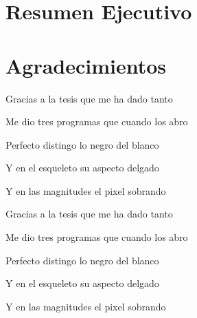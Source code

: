 \begin{preface}
\section{Resumen Ejecutivo}


\section{Agradecimientos}

\noindent Gracias a la tesis que me ha dado tanto

\noindent Me dio tres programas que cuando los abro

\noindent Perfecto distingo lo negro del blanco

\noindent Y en el esqueleto su aspecto delgado

\noindent Y en las magnitudes el pixel sobrando

\noindent 

\noindent Gracias a la tesis que me ha dado tanto

\noindent Me dio tres programas que cuando los abro

\noindent Perfecto distingo lo negro del blanco

\noindent Y en el esqueleto su aspecto delgado

\noindent Y en las magnitudes el pixel sobrando

\tableofcontents

\listoftables

\listoffigures

\end{preface}